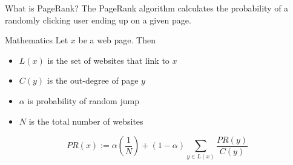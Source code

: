 \begin{frame}{What is PageRank?}
    The PageRank algorithm calculates the probability of a randomly
    clicking user ending up on a given page.
\end{frame}




\begin{frame}{Mathematics}
    Let $x$ be a web page. Then
    \begin{itemize}
        \item $L(x)$ is the set of websites that link to $x$
        \item $C(y)$ is the out-degree of page $y$
        \item $\alpha$ is probability of random jump
        \item $N$ is the total number of websites
    \end{itemize}

    \[\displaystyle PR(x) := \alpha \left ( \frac{1}{N} \right ) + (1-\alpha) \sum_{y\in L(x)} \frac{PR(y)}{C(y)}\]
\end{frame}

